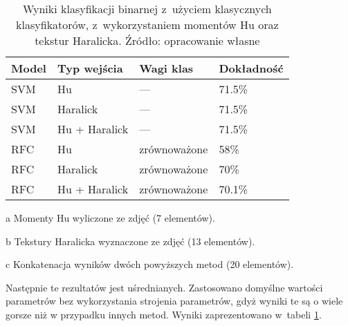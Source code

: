 \begin{table}[h]
	\centering
	\begin{threeparttable}
		\caption{Wyniki klasyfikacji binarnej z~użyciem klasycznych klasyfikatorów, z~wykorzystaniem momentów Hu oraz tekstur Haralicka. Źródło: opracowanie własne}
		\label{hu_haralick_table}
		\begin{tabularx}{1\textwidth}{ |X|X|X|X| }
		  \hline
		  \textbf{Model} & \textbf{Typ wejścia} & \textbf{Wagi klas} & \textbf{Dokładność}\\

		  \hline
		  SVM & Hu\tnote{a} & — & 71.5\%\\

		  \hline
		  SVM & Haralick\tnote{b} & — & 71.5\%\\

		  \hline
		  SVM & Hu + Haralick\tnote{c} & — & 71.5\%\\

		  \hline
		  RFC & Hu & zrównoważone & 58\%\\

		  \hline
  		  RFC & Haralick & zrównoważone & 70\%\\
  		  
		  \hline
  		  RFC & Hu + Haralick & zrównoważone & 70.1\%\\
  		  
		  \hline
		\end{tabularx}
		\begin{tablenotes}
			\footnotesize
			\item[a] Momenty Hu wyliczone ze zdjęć (7 elementów).
			\item[b] Tekstury Haralicka wyznaczone ze zdjęć (13 elementów).
			\item[c] Konkatenacja wyników dwóch powyższych metod (20 elementów).
		\end{tablenotes}
	\end{threeparttable}
\end{table}
Następnie te  rezultatów jest uśrednianych. Zastosowano domyślne wartości parametrów bez wykorzystania strojenia parametrów, gdyż wyniki te są o wiele gorsze niż w przypadku innych metod.
Wyniki zaprezentowano w~tabeli \ref{hu_haralick_table}.
